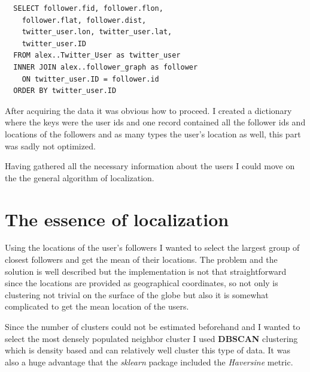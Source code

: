 \documentclass[a4paper,12pt]{article}
\begin{document}
\vspace{.2cm}

\lstset{language=SQL}
\lstset{frame=lines}
\lstset{basicstyle=\footnotesize}
\begin{lstlisting}
  SELECT follower.fid, follower.flon,
    follower.flat, follower.dist,
    twitter_user.lon, twitter_user.lat,
    twitter_user.ID
  FROM alex..Twitter_User as twitter_user
  INNER JOIN alex..follower_graph as follower
    ON twitter_user.ID = follower.id
  ORDER BY twitter_user.ID
\end{lstlisting}

\par After acquiring the data it was obvious how to proceed. I created
a dictionary where the keys were the user ids and one record contained all 
the follower ids and locations of the followers and as many types the user's
location as well, this part was sadly not optimized.

\vspace{.2cm}

\par Having gathered all the necessary information about the users I
could move on the the general algorithm of localization.

\section{The essence of localization}

\par Using the locations of the user's followers I wanted to select the largest
group of closest followers and get the mean of their locations. The problem and 
the solution is well described but the implementation is not that straightforward
since the locations are provided as geographical coordinates, so not only is clustering not
trivial on the surface of the globe but also it is somewhat complicated to get 
the mean location of the users.

\vspace{.2cm}

\par Since the number of clusters could not be estimated beforehand and I wanted to
select the most densely populated neighbor cluster I used \textbf{DBSCAN} \cite{dbscan} clustering
which is density based and can relatively well cluster this type of data.
It was also a huge advantage that the \textit{sklearn} \cite{sklearn} package included the 
\textit{Haversine} metric.
\end{document}
